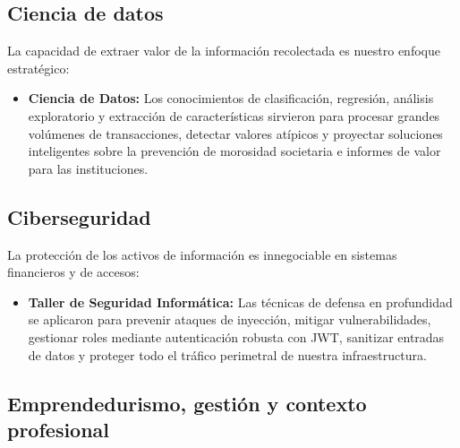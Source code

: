 \subsection{Ciencia de datos}

La capacidad de extraer valor de la información recolectada es nuestro enfoque estratégico:

\begin{itemize}
\item \textbf{Ciencia de Datos:} Los conocimientos de clasificación, regresión, análisis exploratorio y extracción de características sirvieron para procesar grandes volúmenes de transacciones, detectar valores atípicos y proyectar soluciones inteligentes sobre la prevención de morosidad societaria e informes de valor para las instituciones.
\end{itemize}

\subsection{Ciberseguridad}

La protección de los activos de información es innegociable en sistemas financieros y de accesos:
\begin{itemize}
\item \textbf{Taller de Seguridad Informática:} Las técnicas de defensa en profundidad se aplicaron para prevenir ataques de inyección, mitigar vulnerabilidades, gestionar roles mediante autenticación robusta con JWT, sanitizar entradas de datos y proteger todo el tráfico perimetral de nuestra infraestructura.
\end{itemize}

\subsection{Emprendedurismo, gestión y contexto profesional}

